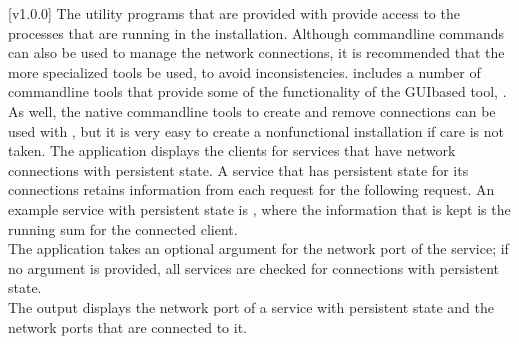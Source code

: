 [v1.0.0]
The utility programs that are provided with \mplusm{} provide access to the processes that
are running in the \mplusm{} installation.
Although command\longDash{}line \yarp{} commands can also be used to manage the network
connections, it is recommended that the more specialized \mplusm{} tools be used, to avoid
inconsistencies.
\mplusm{} includes a number of command\longDash{}line tools that provide some of the
functionality of the GUI\longDash{}based tool, \emph{\CMU}.
As well, the native \yarp{} command\longDash{}line tools to create and remove connections
can be used with \mplusm, but it is very easy to create a non\longDash{}functional
installation if care is not taken.
The application  displays the clients for services that have
\yarp{} network connections with persistent state.
A service that has persistent state for its connections retains information from each
request for the following request.
An example service with persistent state is
, where the information that is kept is the
running sum for the connected client.\\

The application takes an optional argument for the \yarp{} network port of the service;
if no argument is provided, all services are checked for connections with persistent
state.
\insertFullUtilityParameters\\

The output displays the \yarp{} network port of a service with persistent state and the
\yarp{} network ports that are connected to it.\\

